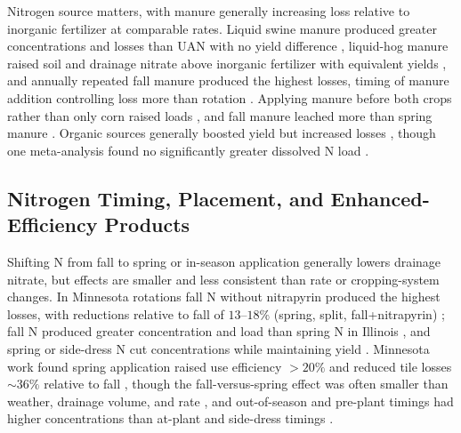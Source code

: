 \documentclass[11pt]{article}
\begin{document}
Nitrogen source matters, with manure generally increasing loss relative to
inorganic fertilizer at comparable rates. Liquid swine manure produced
greater concentrations and losses than UAN with no yield difference
\parencite{Bakhsh2005}, liquid-hog manure raised soil and drainage nitrate
above inorganic fertilizer with equivalent yields \parencite{Elmi2005}, and
annually repeated fall manure produced the highest losses, timing of manure
addition controlling loss more than rotation \parencite{HernandezRamirez2011}.
Applying manure before both crops rather than only corn raised loads
\parencite{Dougherty2020}, and fall manure leached more than spring manure
\parencite{Bakhsh2007,Rekha2011}. Organic sources generally boosted yield but
increased losses \parencite{Liu2021}, though one meta-analysis found no
significantly greater dissolved N load \parencite{Christianson2015b}.

\subsection{Nitrogen Timing, Placement, and Enhanced-Efficiency Products}

Shifting N from fall to spring or in-season application generally lowers
drainage nitrate, but effects are smaller and less consistent than rate or
cropping-system changes. In Minnesota rotations fall N without nitrapyrin
produced the highest losses, with reductions relative to fall of
$13$--$18\%$ (spring, split, fall+nitrapyrin) \parencite{Randall2003,Randall2005};
fall N produced greater concentration and load than spring N in Illinois
\parencite{Gentry2024}, and spring or side-dress N cut concentrations while
maintaining yield \parencite{Pittelkow2017,Vetsch2019}. Minnesota work found
spring application raised use efficiency $>20\%$ and reduced tile losses
$\sim36\%$ relative to fall \parencite{Dinnes2002}, though the fall-versus-spring
effect was often smaller than weather, drainage volume, and rate
\parencite{Liu2021}, and out-of-season and pre-plant timings had higher
concentrations than at-plant and side-dress timings \parencite{Hertzberger2019}.
\end{document}
